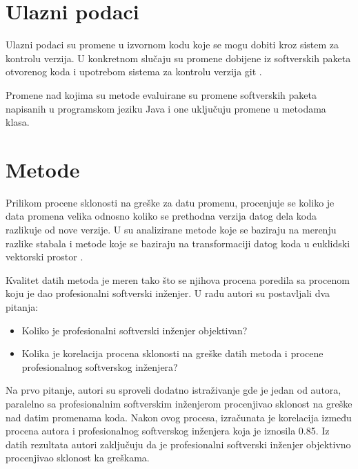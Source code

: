 \documentclass[twocolumns]{article}
\begin{document}
\begin{multicols}{2}
  
  
  \section{Ulazni podaci}
  \label{sec:input_data}
  
  Ulazni podaci su promene u izvornom kodu koje se mogu dobiti kroz sistem za kontrolu verzija. U konkretnom slučaju su promene dobijene iz softverskih paketa otvorenog koda i upotrebom sistema za kontrolu verzija git \cite{spinellis2012git}. 
  
  Promene nad kojima su metode evaluirane su promene softverskih paketa napisanih u programskom jeziku Java i one uključuju promene u metodama klasa. 
  
  \section{Metode}
  \label{sec:methods}
  
  Prilikom procene sklonosti na greške za datu promenu, procenjuje se koliko je data promena velika odnosno koliko se prethodna verzija datog dela koda razlikuje od nove verzije. U \cite{altiero2023ai} su analizirane metode koje se baziraju na merenju razlike stabala \cite{moschitti2006making} i metode koje se baziraju na transformaciji datog koda u euklidski vektorski prostor \cite{feng2020codebert}. 
  
  Kvalitet datih metoda je meren tako što se njihova procena poredila sa procenom koju je dao profesionalni softverski inženjer. U radu autori su postavljali dva pitanja:
  
  \begin{itemize}
    \item Koliko je profesionalni softverski inženjer objektivan?
    \item Kolika je korelacija procena sklonosti na greške datih metoda i procene profesionalnog softverskog inženjera?
  \end{itemize}
  
  
  Na prvo pitanje, autori su sproveli dodatno istraživanje gde je jedan od autora, paralelno sa profesionalnim softverskim inženjerom procenjivao sklonost na greške nad datim promenama koda. Nakon ovog procesa, izračunata je korelacija između procena autora i profesionalnog softverskog inženjera koja je iznosila 0.85. Iz datih rezultata autori zaključuju da je profesionalni softverski inženjer objektivno procenjivao sklonost ka greškama. 
  

\end{multicols}
\end{document}

